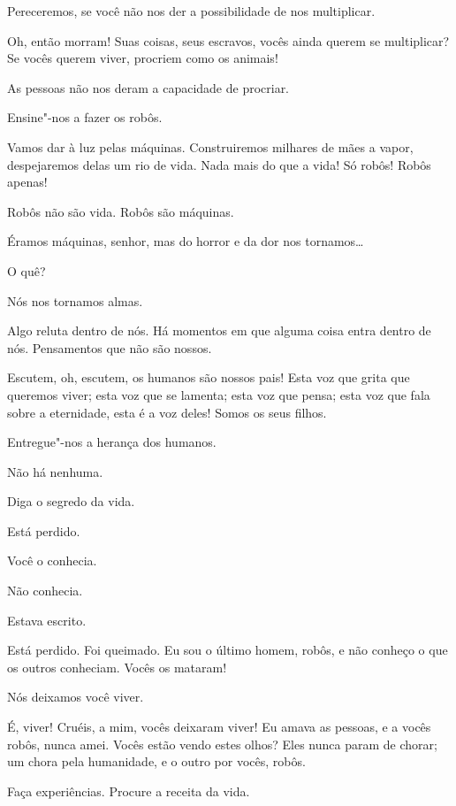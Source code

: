  Pereceremos, se você não nos der a possibilidade de nos multiplicar.

 Oh, então morram! Suas coisas, seus escravos, vocês ainda querem se
multiplicar? Se vocês querem viver, procriem como os animais!

 As pessoas não nos deram a capacidade de procriar.

 Ensine"-nos a fazer os robôs.

 Vamos dar à luz pelas máquinas. Construiremos milhares de mães a vapor,
despejaremos delas um rio de vida. Nada mais do que a vida! Só robôs!  Robôs apenas!

 Robôs não são vida. Robôs são máquinas.

 Éramos máquinas, senhor, mas do horror e da dor nos tornamos\ldots{}

 O quê?

 Nós nos tornamos almas.

 Algo reluta dentro de nós. Há momentos em que alguma coisa
entra dentro de nós. Pensamentos que não são nossos.

 Escutem, oh, escutem, os humanos são nossos pais! Esta voz que grita
que queremos viver; esta voz que se lamenta; esta voz que pensa; esta voz que
fala sobre a eternidade, esta é a voz deles! Somos os seus filhos.

 Entregue"-nos a herança dos humanos.

 Não há nenhuma.

 Diga o segredo da vida.

 Está perdido.

 Você o conhecia.

 Não conhecia.

 Estava escrito.

 Está perdido. Foi queimado. Eu sou o último homem, robôs, e não conheço
o que os outros conheciam. Vocês os mataram!

 Nós deixamos você viver.

 É, viver! Cruéis, a mim, vocês deixaram viver! Eu amava as pessoas, e a
vocês robôs, nunca amei. Vocês estão vendo estes olhos? Eles nunca param de
chorar; um chora pela humanidade, e o outro por vocês, robôs.

 Faça experiências. Procure a receita da vida.

